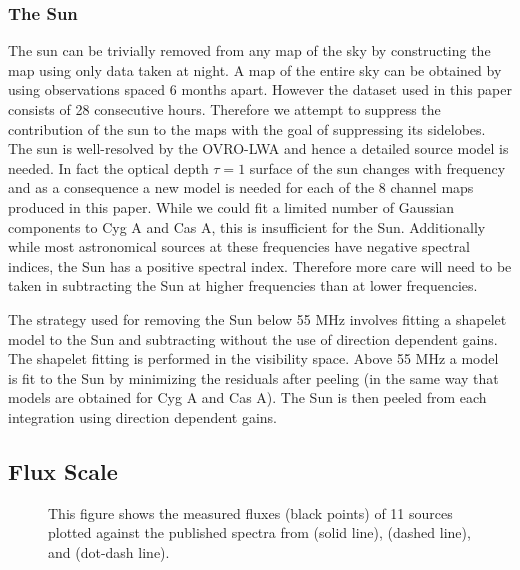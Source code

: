 \documentclass[twocolumn]{aastex61}
\begin{document}
\subsubsection{The Sun}

The sun can be trivially removed from any map of the sky by constructing the map using only data
taken at night. A map of the entire sky can be obtained by using observations spaced 6 months apart.
However the dataset used in this paper consists of 28 consecutive hours. Therefore we attempt to
suppress the contribution of the sun to the maps with the goal of suppressing its sidelobes.  The
sun is well-resolved by the OVRO-LWA and hence a detailed source model is needed. In fact the
optical depth $\tau=1$ surface of the sun changes with frequency and as a consequence a new model is
needed for each of the 8 channel maps produced in this paper. While we could fit a limited number of
Gaussian components to Cyg A and Cas A, this is insufficient for the Sun.  Additionally while most
astronomical sources at these frequencies have negative spectral indices, the Sun has a positive
spectral index. Therefore more care will need to be taken in subtracting the Sun at higher
frequencies than at lower frequencies.

The strategy used for removing the Sun below 55 MHz involves fitting a shapelet
\citep{2003MNRAS.338...35R} model to the Sun and subtracting without the use of direction dependent
gains. The shapelet fitting is performed in the visibility space. Above 55 MHz a model is fit to the
Sun by minimizing the residuals after peeling (in the same way that models are obtained for Cyg A
and Cas A). The Sun is then peeled from each integration using direction dependent gains.

\subsection{Flux Scale}

\begin{figure*}[p]
    \caption{
        This figure shows the measured fluxes (black points) of 11 sources plotted against the
        published spectra from \citet{2017ApJS..230....7P} (solid line), \citet{2012MNRAS.423L..30S}
        (dashed line), and \citet{1977A&A....61...99B} (dot-dash line).
    }
    \label{fig:flux-scale}
\end{figure*}
\end{document}
